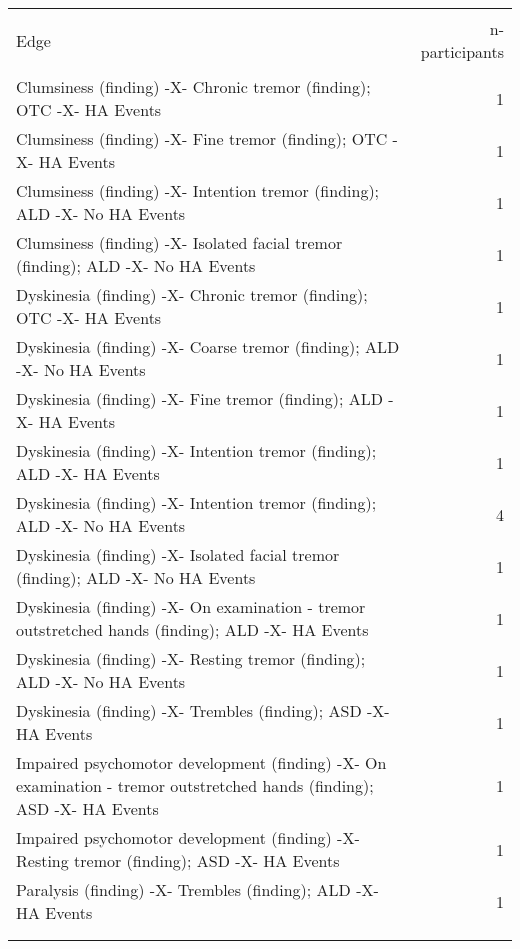 \documentclass[10pt, letterpaper]{article}
\begin{document}
\begin{spacing}{1.0}
\begin{small}
\begin{longtable}[H]{p{5in}r}
        &\\[-4pt]
        \hline\\[-8pt]
        Edge & n-participants\\
        \hline\\[-6pt]
        Clumsiness (finding) -X- Chronic tremor (finding); OTC -X- HA Events & 1 \\
        \rowcolor{ltBlue}
        Clumsiness (finding) -X- Fine tremor (finding); OTC -X- HA Events & 1 \\
        Clumsiness (finding) -X- Intention tremor (finding); ALD -X- No HA Events & 1 \\
        \rowcolor{ltBlue}
        Clumsiness (finding) -X- Isolated facial tremor (finding); ALD -X- No HA Events & 1 \\
        Dyskinesia (finding) -X- Chronic tremor (finding); OTC -X- HA Events & 1 \\
        \rowcolor{ltBlue}
        Dyskinesia (finding) -X- Coarse tremor (finding); ALD -X- No HA Events & 1 \\
        Dyskinesia (finding) -X- Fine tremor (finding); ALD -X- HA Events & 1 \\
        \rowcolor{ltBlue}
        Dyskinesia (finding) -X- Intention tremor (finding); ALD -X- HA Events & 1 \\
        Dyskinesia (finding) -X- Intention tremor (finding); ALD -X- No HA Events & 4 \\
        \rowcolor{ltBlue}
        Dyskinesia (finding) -X- Isolated facial tremor (finding); ALD -X- No HA Events & 1 \\
        Dyskinesia (finding) -X- On examination - tremor outstretched hands (finding); ALD -X- HA Events & 1 \\
        \rowcolor{ltBlue}
        Dyskinesia (finding) -X- Resting tremor (finding); ALD -X- No HA Events & 1 \\
        Dyskinesia (finding) -X- Trembles (finding); ASD -X- HA Events & 1 \\
        \rowcolor{ltBlue}
        Impaired psychomotor development (finding) -X- On examination - tremor outstretched hands (finding); ASD -X- HA Events & 1 \\
        Impaired psychomotor development (finding) -X- Resting tremor (finding); ASD -X- HA Events & 1 \\
        \rowcolor{ltBlue}
        Paralysis (finding) -X- Trembles (finding); ALD -X- HA Events & 1 \\
        & \\[-6pt]
        \hline
        \label{tab:MD-Tr-Dx-HA-01}
    \end{longtable}
\end{small}


\end{spacing}
\end{document}
